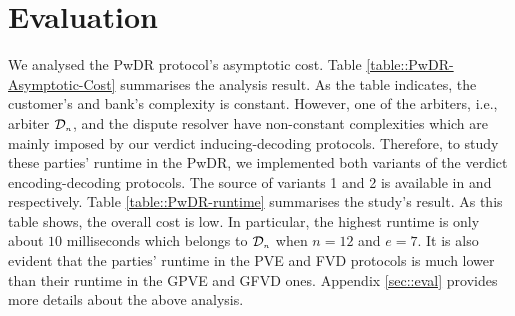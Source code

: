 
\section{Evaluation}%






We analysed the PwDR protocol's asymptotic cost. Table \ref{table::PwDR-Asymptotic-Cost} summarises the analysis result.  As the table indicates, the customer's and bank's complexity is  constant. However, one of the arbiters, i.e., arbiter $\mathcal{D}_{\scriptscriptstyle n}$, and the dispute resolver have non-constant complexities which are mainly imposed by our verdict inducing-decoding protocols. Therefore, to study these parties' runtime in the PwDR, we  implemented both variants of the verdict encoding-decoding protocols. The source of  variants 1 and 2 is available in \cite{variant-1} and \cite{variant-2} respectively.  Table \ref{table::PwDR-runtime} summarises the study's result. As this table shows,  the overall cost is  low. In particular, the highest runtime is only about $10$ milliseconds which belongs to $\mathcal{D}_{\scriptscriptstyle n}$ when $n=12$ and $e=7$. It is also evident that the parties' runtime in the PVE and FVD protocols is much lower than their runtime in the GPVE and GFVD ones.  Appendix \ref{sec::eval} provides more details about the above    analysis.



\vspace{-.4mm}

\vspace{-3mm}


